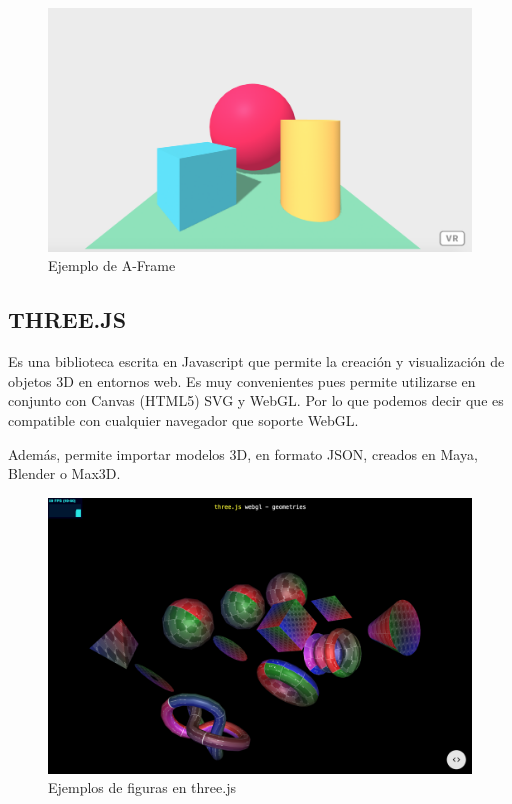 \documentclass[a4paper, 12pt]{book}
\begin{document}
\begin{figure}[H]
  \centering
  \includegraphics[width=12cm, keepaspectratio]{img/development/aframe.png}
  \caption{Ejemplo de A-Frame}
  \label{fig:aframeexample}
\end{figure}

\subsection{THREE.JS}
Es una biblioteca escrita en Javascript que permite la creación y visualización de objetos 3D en entornos web\cite{dirksen:_threejs}. Es muy convenientes pues permite utilizarse en conjunto con Canvas (HTML5) SVG y WebGL. Por lo que podemos decir que es compatible con cualquier navegador que soporte WebGL.

Además, permite importar modelos 3D, en formato JSON,  creados en Maya, Blender o Max3D.

\begin{figure}[H]
  \centering
  \includegraphics[width=12cm, keepaspectratio]{img/development/threejs.png}
  \caption{Ejemplos de figuras en three.js}
  \label{fig:threeexample}
\end{figure}
\end{document}
